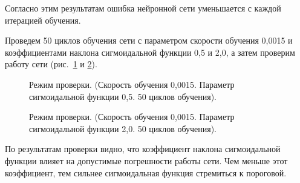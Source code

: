 Согласно этим результатам ошибка нейронной сети уменьшается с каждой итерацией обучения.

Проведем 50 циклов обучения сети с параметром скорости обучения 0,0015 и коэффициентами наклона сигмоидальной функции 0,5 и 2,0, а затем проверим работу сети (рис.~\ref{ris:check_0,0015_0,5_50} и \ref{ris:check_0,0015_2,0_50}).

\begin{figure}[h]
\caption{Режим проверки. (Скорость обучения 0,0015. Параметр сигмоидальной функции 0,5. 50 циклов обучения).}
\label{ris:check_0,0015_0,5_50}
\end{figure}

\begin{figure}[h]
\caption{Режим проверки. (Скорость обучения 0,0015. Параметр сигмоидальной функции 2,0. 50 циклов обучения).}
\label{ris:check_0,0015_2,0_50}
\end{figure}

По результатам проверки видно, что коэффициент наклона сигмоидальной функции влияет на допустимые погрешности работы сети. Чем меньше этот коэффициент, тем сильнее сигмоидальная функция стремиться к пороговой.




